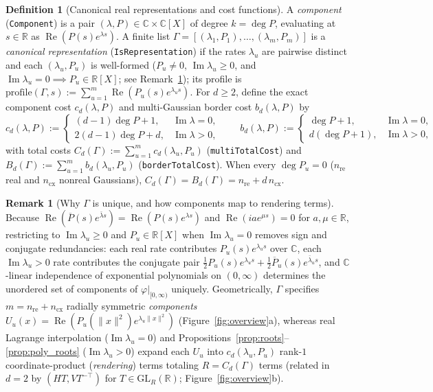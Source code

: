 \documentclass[11pt,a4paper]{article}
\theoremstyle{plain}
\theoremstyle{definition}
\newtheorem{definition}[theorem]{Definition}
\newtheorem{remark}[theorem]{Remark}
\newcommand{\R}{\mathbb{R}}
\newcommand{\C}{\mathbb{C}}
\DeclareMathOperator{\RePart}{Re}
\DeclareMathOperator{\ImPart}{Im}
\DeclareRobustCommand{\leanid}[1]{{\def\_{\textunderscore\allowbreak}\texttt{#1}}}
\begin{document}
\begin{definition}[Canonical real representations and cost functions]\label{def:rep}
A \emph{component} (\leanid{Component}) is a pair $(\lambda, P) \in \C \times \C[X]$ of degree $k = \deg P$, evaluating at $s \in \R$ as $\RePart(P(s)e^{\lambda s})$. A finite list $\Gamma = [(\lambda_1, P_1), \dots, (\lambda_m, P_m)]$ is a \emph{canonical representation} (\leanid{IsRepresentation}) if the rates $\lambda_u$ are pairwise distinct and each $(\lambda_u, P_u)$ is well-formed ($P_u \ne 0$, $\ImPart\lambda_u \ge 0$, and $\ImPart\lambda_u = 0 \implies P_u \in \R[X]$; see Remark~\ref{rem:canonical_unique}); its profile is $\mathrm{profile}(\Gamma, s) := \sum_{u=1}^m \RePart(P_u(s)e^{\lambda_u s})$. For $d \ge 2$, define the exact component cost $c_d(\lambda, P)$ and multi-Gaussian border cost $b_d(\lambda, P)$ by
\begin{equation}\label{eq:costs}
  c_d(\lambda, P) := \begin{cases}
    (d - 1)\deg P + 1, & \ImPart\lambda = 0,\\
    2(d - 1)\deg P + d, & \ImPart\lambda > 0,
  \end{cases}
  \qquad
  b_d(\lambda, P) := \begin{cases}
    \deg P + 1, & \ImPart\lambda = 0,\\
    d(\deg P + 1), & \ImPart\lambda > 0,
  \end{cases}
\end{equation}
with total costs $C_d(\Gamma) := \sum_{u=1}^m c_d(\lambda_u, P_u)$ (\leanid{multiTotalCost}) and $B_d(\Gamma) := \sum_{u=1}^m b_d(\lambda_u, P_u)$ (\leanid{borderTotalCost}). When every $\deg P_u = 0$ ($n_{\mathrm{re}}$ real and $n_{\mathrm{cx}}$ nonreal Gaussians), $C_d(\Gamma) = B_d(\Gamma) = n_{\mathrm{re}} + d\,n_{\mathrm{cx}}$.
\end{definition}

\begin{remark}[Why $\Gamma$ is unique, and how components map to rendering terms]\label{rem:canonical_unique}
Because $\RePart(\overline{P}(s)e^{\bar\lambda s}) = \RePart(P(s)e^{\lambda s})$ and $\RePart(i a e^{\mu s}) = 0$ for $a, \mu \in \R$, restricting to $\ImPart\lambda_u \ge 0$ and $P_u \in \R[X]$ when $\ImPart\lambda_u = 0$ removes sign and conjugate redundancies: each real rate contributes $P_u(s)e^{\lambda_u s}$ over $\C$, each $\ImPart\lambda_u > 0$ rate contributes the conjugate pair $\frac{1}{2}P_u(s)e^{\lambda_u s} + \frac{1}{2}\overline{P}_u(s)e^{\bar\lambda_u s}$, and $\C$-linear independence of exponential polynomials on $(0,\infty)$ determines the unordered set of components of $\varphi|_{[0,\infty)}$ uniquely. Geometrically, $\Gamma$ specifies $m = n_{\mathrm{re}} + n_{\mathrm{cx}}$ radially symmetric \emph{components} $U_u(x) = \RePart(P_u(\|x\|^2)e^{\lambda_u\|x\|^2})$ (Figure~\ref{fig:overview}a), whereas real Lagrange interpolation ($\ImPart\lambda_u = 0$) and Propositions~\ref{prop:roots}--\ref{prop:poly_roots} ($\ImPart\lambda_u > 0$) expand each $U_u$ into $c_d(\lambda_u, P_u)$ rank-$1$ coordinate-product (\emph{rendering}) terms totaling $R = C_d(\Gamma)$ terms (related in $d = 2$ by $(H T, V T^{-\top})$ for $T \in \mathrm{GL}_R(\R)$; Figure~\ref{fig:overview}b).
\end{remark}
\end{document}
